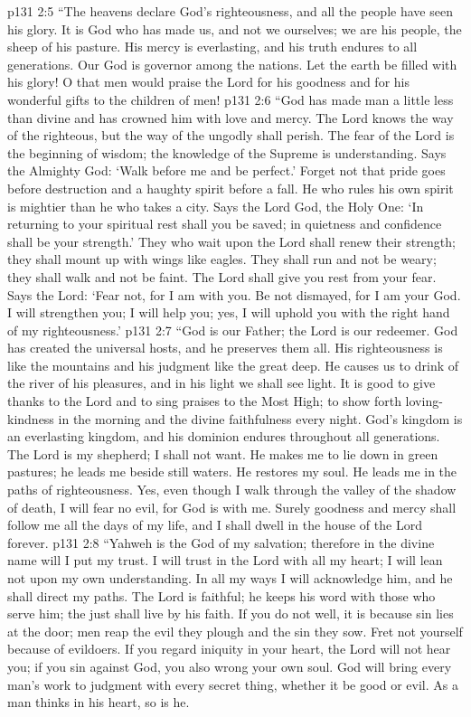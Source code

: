 \vs p131 2:5 “The heavens declare God’s righteousness, and all the people have seen his glory. It is God who has made us, and not we ourselves; we are his people, the sheep of his pasture. His mercy is everlasting, and his truth endures to all generations. Our God is governor among the nations. Let the earth be filled with his glory! O that men would praise the Lord for his goodness and for his wonderful gifts to the children of men!
\vs p131 2:6 “God has made man a little less than divine and has crowned him with love and mercy. The Lord knows the way of the righteous, but the way of the ungodly shall perish. The fear of the Lord is the beginning of wisdom; the knowledge of the Supreme is understanding. Says the Almighty God: ‘Walk before me and be perfect.’ Forget not that pride goes before destruction and a haughty spirit before a fall. He who rules his own spirit is mightier than he who takes a city. Says the Lord God, the Holy One: ‘In returning to your spiritual rest shall you be saved; in quietness and confidence shall be your strength.’ They who wait upon the Lord shall renew their strength; they shall mount up with wings like eagles. They shall run and not be weary; they shall walk and not be faint. The Lord shall give you rest from your fear. Says the Lord: ‘Fear not, for I am with you. Be not dismayed, for I am your God. I will strengthen you; I will help you; yes, I will uphold you with the right hand of my righteousness.’
\vs p131 2:7 “God is our Father; the Lord is our redeemer. God has created the universal hosts, and he preserves them all. His righteousness is like the mountains and his judgment like the great deep. He causes us to drink of the river of his pleasures, and in his light we shall see light. It is good to give thanks to the Lord and to sing praises to the Most High; to show forth loving\hyp{}kindness in the morning and the divine faithfulness every night. God’s kingdom is an everlasting kingdom, and his dominion endures throughout all generations. The Lord is my shepherd; I shall not want. He makes me to lie down in green pastures; he leads me beside still waters. He restores my soul. He leads me in the paths of righteousness. Yes, even though I walk through the valley of the shadow of death, I will fear no evil, for God is with me. Surely goodness and mercy shall follow me all the days of my life, and I shall dwell in the house of the Lord forever.
\vs p131 2:8 “Yahweh is the God of my salvation; therefore in the divine name will I put my trust. I will trust in the Lord with all my heart; I will lean not upon my own understanding. In all my ways I will acknowledge him, and he shall direct my paths. The Lord is faithful; he keeps his word with those who serve him; the just shall live by his faith. If you do not well, it is because sin lies at the door; men reap the evil they plough and the sin they sow. Fret not yourself because of evildoers. If you regard iniquity in your heart, the Lord will not hear you; if you sin against God, you also wrong your own soul. God will bring every man’s work to judgment with every secret thing, whether it be good or evil. As a man thinks in his heart, so is he.

